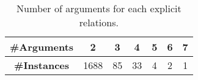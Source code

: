 \begin{table}[ht]
\centering
\begin{tabular}{|c|c|c|c|c|c|c|}
\hline

\bf \#Arguments              & 2    & 3   & 4   & 5   & 6  & 7  \\ \hline
\bf \#Instances              & 1688 & 85  & 33  & 4   & 2  & 1  \\ \hline

\end{tabular}
\caption{\label{t:argument-num} Number of arguments for each explicit relations. }
\end{table}
